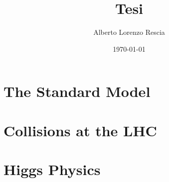 \documentclass[10pt,a4paper]{book}
\title{Tesi}
\author{Alberto Lorenzo Rescia}
\date{\today}
\begin{document}
\chapter{The Standard Model}


\chapter{Collisions at the LHC}


\chapter{Higgs Physics}




\end{document}
